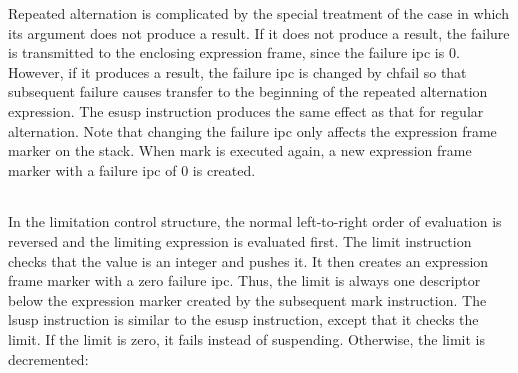 Repeated alternation is complicated by the special treatment of the
case in which its argument does not produce a result. If it does not
produce a result, the failure is transmitted to the enclosing
expression frame, since the failure ipc is 0. However, if it produces
a result, the failure ipc is changed by chfail so that subsequent
failure causes transfer to the beginning of the repeated alternation
expression. The esusp instruction produces the same effect as that for
regular alternation. Note that changing the failure ipc only affects
the expression frame marker on the stack. When mark is executed again,
a new expression frame marker with a failure ipc of 0 is created.

\begin{center}
\tabletail{}
\tablelasttail{}
\begin{supertabular}{|m{1.9073598in}|m{2.75596in}|}

\end{supertabular}
\end{center}

In the limitation control structure, the normal left-to-right order of
evaluation is reversed and the limiting expression is evaluated
first. The limit instruction checks that the value is an integer and
pushes it. It then creates an expression frame marker with a zero
failure ipc. Thus, the limit is always one descriptor below the
expression marker created by the subsequent mark instruction. The
lsusp instruction is similar to the esusp instruction, except that it
checks the limit. If the limit is zero, it fails instead of
suspending. Otherwise, the limit is decremented:

